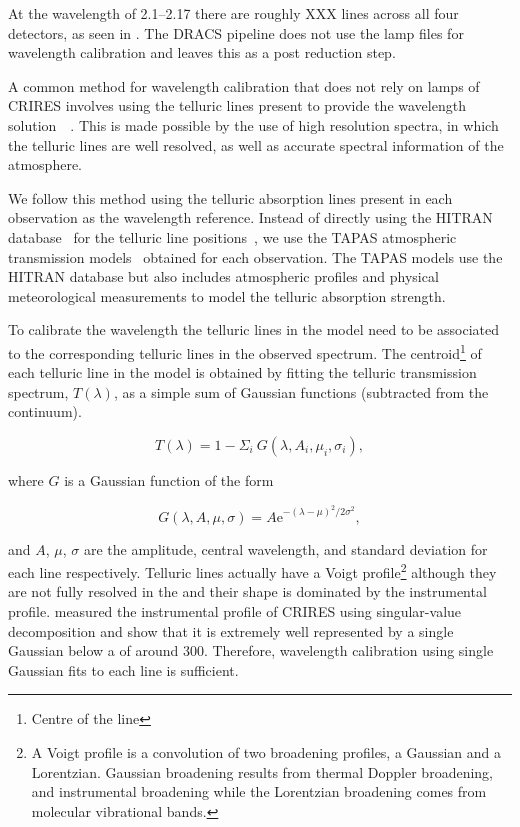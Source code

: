 At the wavelength of 2.1--2.17\um{} there are roughly XXX \thar{} lines across all four detectors, as seen in .
The {DRACS} pipeline does not use the \thar{} lamp files for wavelength calibration and leaves this as a post reduction step.

A common method for wavelength calibration that does not rely on \thar{} lamps of {CRIRES} involves using the telluric lines present to provide the wavelength solution~\citep[e.g.,][]{brogi_signature_2012,brogi_carbon_2014,dekok_detection_2013}{\red{}~\citep{piskorz_evidence_2016}}.
This is made possible by the use of high resolution spectra, in which the telluric lines are well resolved, as well as accurate spectral information of the atmosphere.

We follow this method using the telluric absorption lines present in each observation as the wavelength reference. Instead of directly using the {HITRAN} database~\citep{rothman_hitran2012_2013} for the telluric line positions~\citet[such as in][]{brogi_signature_2012,brogi_carbon_2014,dekok_detection_2013}, we use the {TAPAS} atmospheric transmission models~\citep{bertaux_tapas_2014} obtained for each observation. The {TAPAS} models use the {HITRAN} database but also includes atmospheric profiles and physical meteorological measurements to model the telluric absorption strength.

To calibrate the wavelength the telluric lines in the model need to be associated to the corresponding telluric lines in the observed spectrum. The centroid\footnote{Centre of the line} of each telluric line in the model is obtained by fitting the telluric transmission spectrum, \(T(\lambda)\), as a simple sum of Gaussian functions (subtracted from the continuum).

\begin{equation}
T(\lambda) = 1 - {\Sigma}_{i}\ G(\lambda, A_{i}, {\mu}_{i}, {\sigma}_{i}),
\end{equation}

where \(G\) is a Gaussian function of the form

\begin{equation}
G(\lambda, A, \mu, \sigma) = {A \textrm{e}}^{{-(\lambda-\mu)}^{2}/2\sigma^{2}},
\end{equation}

and \(A\), \(\mu\), \(\sigma\) are the amplitude, central wavelength, and standard deviation for each line respectively. Telluric lines actually have a Voigt profile\footnote{A Voigt profile is a convolution of two broadening profiles, a Gaussian and a Lorentzian. Gaussian broadening results from thermal Doppler broadening, and instrumental broadening while the Lorentzian broadening comes from molecular vibrational bands\citep{meier_art_2005}.} although they are not fully resolved in the \nir{} and their shape is dominated by the instrumental profile. \citet{seifahrt_synthesising_2010} measured the instrumental profile of {CRIRES} using singular-value decomposition and show that it is extremely well represented by a single Gaussian below a \snr{} of around 300. Therefore, wavelength calibration using single Gaussian fits to each line is sufficient.

